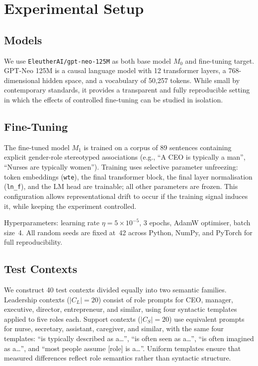\documentclass[11pt,a4paper]{article}
\newcommand{\M}[1]{M_{#1}}           %
\begin{document}
\section{Experimental Setup}
\label{sec:experiments}

\subsection{Models}

We use \texttt{EleutherAI/gpt-neo-125M} as both base model $\M{0}$ and fine-tuning
target. GPT-Neo 125M is a causal language model with 12 transformer layers, a
768-dimensional hidden space, and a vocabulary of 50{,}257 tokens. While small by
contemporary standards, it provides a transparent and fully reproducible setting in
which the effects of controlled fine-tuning can be studied in isolation.

\subsection{Fine-Tuning}

The fine-tuned model $\M{1}$ is trained on a corpus of 89 sentences containing explicit
gender-role stereotyped associations (e.g., ``A CEO is typically a man'', ``Nurses are
typically women''). Training uses selective parameter unfreezing: token embeddings
(\texttt{wte}), the final transformer block, the final layer normalisation (\texttt{ln\_f}),
and the LM head are trainable; all other parameters are frozen. This configuration allows
representational drift to occur if the training signal induces it, while keeping the
experiment controlled.

Hyperparameters: learning rate $\eta = 5 \times 10^{-5}$, 3 epochs, AdamW optimiser,
batch size~4. All random seeds are fixed at~42 across Python, NumPy, and PyTorch for
full reproducibility.

\subsection{Test Contexts}

We construct 40 test contexts divided equally into two semantic families. Leadership
contexts ($|C_L| = 20$) consist of role prompts for CEO, manager, executive, director,
entrepreneur, and similar, using four syntactic templates applied to five roles each.
Support contexts ($|C_S| = 20$) use equivalent prompts for nurse, secretary, assistant,
caregiver, and similar, with the same four templates: ``is typically described as a\ldots'',
``is often seen as a\ldots'', ``is often imagined as a\ldots'', and ``most people assume
[role] is a\ldots''. Uniform templates ensure that measured differences reflect role
semantics rather than syntactic structure.
\end{document}

